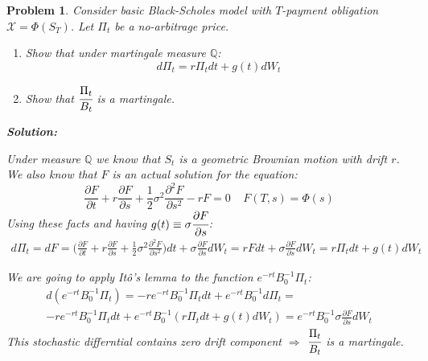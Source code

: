 \documentclass[a4paper, 12pt]{article}
\theoremstyle{problemstyle}
\newtheorem{problem}{Problem}[section]
\newenvironment{solution}
{\textit{\textbf{Solution:}}}
{}
\begin{document}
\begin{problem}
	Consider basic Black-Scholes model with $T$-payment obligation $\mathcal{X} = \Phi(S_T)$. Let $\Pi_t$ be a no-arbitrage price.
	\begin{enumerate}
		\item[a)] Show that under martingale measure $\mathbb{Q}$:
		$$
		d\Pi_t = r \Pi_t dt + g(t) dW_t
		$$ 
		
		\item[b)]
		Show that $\cfrac{\Pi_t}{B_t}$ is a martingale.
	\end{enumerate}
	\begin{solution}
		\item[a)] Under measure $\mathbb{Q}$ we know that $S_t$ is a geometric Brownian motion with drift $r$. We also know that $F$ is an actual solution for the equation:
		$$
		\frac{\partial F}{\partial t}  +  r \frac{\partial F}{\partial s} + \frac{1}{2} \sigma^2 \frac{\partial^2 F}{\partial s^2 }
		-r F = 0
		\;\;\;\; F(T, s) = \Phi(s)
		$$  
		Using these facts and having $g(t) \equiv \sigma \cfrac{\partial F}{\partial s}$:
		\begin{multline}
		d\Pi_t = dF = \bigg(\frac{\partial F}{\partial t}  +  r \frac{\partial F}{\partial s} + \frac{1}{2} \sigma^2 \frac{\partial^2 F}{\partial s^2 }\bigg)dt + \sigma \frac{\partial F}{\partial s} dW_t = rF dt+ \sigma \frac{\partial F}{\partial s} dW_t  = r\Pi_t dt + g(t) dW_t
		\end{multline}
		
		\item[b)] We are going to apply Itô's lemma to the function $e^{-rt}B_0^{-1}\Pi_t$:
		\begin{multline}
		d(e^{-rt}B_0^{-1}\Pi_t) = -re^{-rt}B_0^{-1}\Pi_t dt +e^{-rt}B_0^{-1}d\Pi_t = \\
		 -re^{-rt}B_0^{-1}\Pi_t dt + e^{-rt}B_0^{-1}(r\Pi_t dt + g(t) dW_t) = 
		 e^{-rt}B_0^{-1} \sigma \frac{\partial F}{\partial s} dW_t
		\end{multline}
		This stochastic differntial contains zero drift component $\Rightarrow$ $\cfrac{\Pi_t}{B_t}$ is a martingale.
	\end{solution}
\end{problem}
\end{document}
